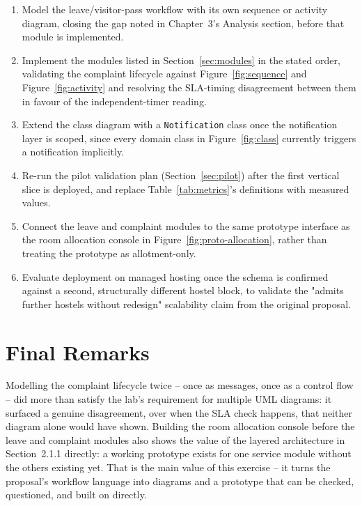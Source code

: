 \documentclass{tietreport}
\begin{document}
\begin{enumerate}
  \item Model the leave/visitor-pass workflow with its own sequence or
    activity diagram, closing the gap noted in Chapter~3's Analysis
    section, before that module is implemented.
  \item Implement the modules listed in Section~\ref{sec:modules} in the
    stated order, validating the complaint lifecycle against
    Figure~\ref{fig:sequence} and Figure~\ref{fig:activity} and
    resolving the SLA-timing disagreement between them in favour of the
    independent-timer reading.
  \item Extend the class diagram with a \texttt{Notification} class once
    the notification layer is scoped, since every domain class in
    Figure~\ref{fig:class} currently triggers a notification implicitly.
  \item Re-run the pilot validation plan (Section~\ref{sec:pilot}) after
    the first vertical slice is deployed, and replace
    Table~\ref{tab:metrics}'s definitions with measured values.
  \item Connect the leave and complaint modules to the same prototype
    interface as the room allocation console in
    Figure~\ref{fig:proto-allocation}, rather than treating the
    prototype as allotment-only.
  \item Evaluate deployment on managed hosting once the schema is
    confirmed against a second, structurally different hostel block, to
    validate the "admits further hostels without redesign" scalability
    claim from the original proposal.
\end{enumerate}

\section{Final Remarks}

Modelling the complaint lifecycle twice -- once as messages, once as a
control flow -- did more than satisfy the lab's requirement for
multiple UML diagrams: it surfaced a genuine disagreement, over when
the SLA check happens, that neither diagram alone would have shown.
Building the room allocation console before the leave and complaint
modules also shows the value of the layered architecture in
Section~2.1.1 directly: a working prototype exists for one service
module without the others existing yet. That is the main value of this
exercise -- it turns the proposal's workflow language into diagrams and
a prototype that can be checked, questioned, and built on directly.

\printbibliography[heading=bibintoc]
\end{document}
